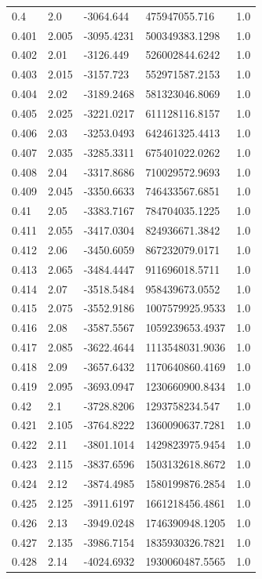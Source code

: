 \begin{tabular}{lllll}
0.4 & 2.0 & -3064.644 & 475947055.716 & 1.0 \\
0.401 & 2.005 & -3095.4231 & 500349383.1298 & 1.0 \\
0.402 & 2.01 & -3126.449 & 526002844.6242 & 1.0 \\
0.403 & 2.015 & -3157.723 & 552971587.2153 & 1.0 \\
0.404 & 2.02 & -3189.2468 & 581323046.8069 & 1.0 \\
0.405 & 2.025 & -3221.0217 & 611128116.8157 & 1.0 \\
0.406 & 2.03 & -3253.0493 & 642461325.4413 & 1.0 \\
0.407 & 2.035 & -3285.3311 & 675401022.0262 & 1.0 \\
0.408 & 2.04 & -3317.8686 & 710029572.9693 & 1.0 \\
0.409 & 2.045 & -3350.6633 & 746433567.6851 & 1.0 \\
0.41 & 2.05 & -3383.7167 & 784704035.1225 & 1.0 \\
0.411 & 2.055 & -3417.0304 & 824936671.3842 & 1.0 \\
0.412 & 2.06 & -3450.6059 & 867232079.0171 & 1.0 \\
0.413 & 2.065 & -3484.4447 & 911696018.5711 & 1.0 \\
0.414 & 2.07 & -3518.5484 & 958439673.0552 & 1.0 \\
0.415 & 2.075 & -3552.9186 & 1007579925.9533 & 1.0 \\
0.416 & 2.08 & -3587.5567 & 1059239653.4937 & 1.0 \\
0.417 & 2.085 & -3622.4644 & 1113548031.9036 & 1.0 \\
0.418 & 2.09 & -3657.6432 & 1170640860.4169 & 1.0 \\
0.419 & 2.095 & -3693.0947 & 1230660900.8434 & 1.0 \\
0.42 & 2.1 & -3728.8206 & 1293758234.547 & 1.0 \\
0.421 & 2.105 & -3764.8222 & 1360090637.7281 & 1.0 \\
0.422 & 2.11 & -3801.1014 & 1429823975.9454 & 1.0 \\
0.423 & 2.115 & -3837.6596 & 1503132618.8672 & 1.0 \\
0.424 & 2.12 & -3874.4985 & 1580199876.2854 & 1.0 \\
0.425 & 2.125 & -3911.6197 & 1661218456.4861 & 1.0 \\
0.426 & 2.13 & -3949.0248 & 1746390948.1205 & 1.0 \\
0.427 & 2.135 & -3986.7154 & 1835930326.7821 & 1.0 \\
0.428 & 2.14 & -4024.6932 & 1930060487.5565 & 1.0 \\

\end{tabular}
